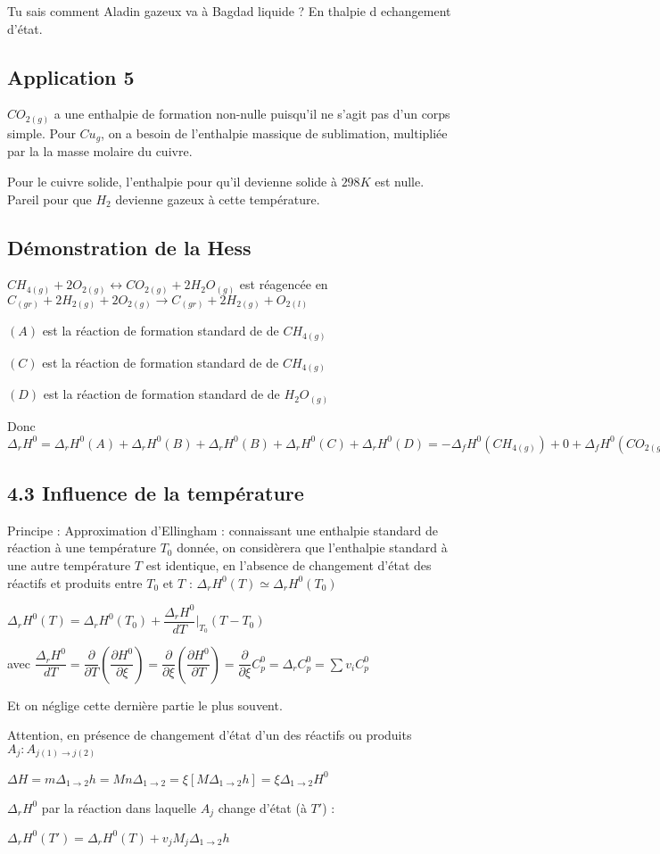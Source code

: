 \documentclass[a4paper,12pt]{book}
\begin{document}
Tu sais comment Aladin gazeux va à Bagdad liquide ? En thalpie d echangement d'état.
\subsection{Application 5}
$CO_{2(g)}$ a une enthalpie de formation non-nulle puisqu'il ne s'agit pas d'un corps simple. Pour $Cu_{g}$, on a besoin de l'enthalpie massique de sublimation, multipliée par la la masse molaire du cuivre.
\par Pour le cuivre solide, l'enthalpie pour qu'il devienne solide à $298K$ est nulle. Pareil pour que $H_2$ devienne gazeux à cette température.

\subsection{Démonstration de la Hess}
$CH_{4(g)} + 2O_{2(g)}\leftrightarrow CO_{2(g)}+2H_2O_{(g)}$ est réagencée en $C_{(gr)}+2H_{2(g)}+2O_{2(g)}\rightarrow C_{(gr)}+2H_{2(g)} +O_{2(l)}$
\par $(A)$ est la réaction de formation standard de de $CH_{4(g)}$ \par $(C)$ est la réaction de formation standard de de $CH_{4(g)}$ \par $(D)$ est la réaction de formation standard de de $H_2O_{(g)}$
\par Donc $\Delta_rH^0=\Delta_rH^0(A)+\Delta_rH^0(B)+\Delta_rH^0(B)+\Delta_rH^0(C)+\Delta_rH^0(D)=-\Delta_fH^0(CH_{4(g)})+0+\Delta_fH^0(CO_{2(g)})+2\Delta_fH^0(H_2O_{(g)})$




\subsection{4.3 Influence de la température}
Principe : Approximation d'Ellingham : connaissant une enthalpie standard de réaction à une température $T_0$ donnée, on considèrera que l'enthalpie standard à une autre température $T$ est identique, en l'absence de changement d'état des réactifs et produits entre $T_0$ et $T$ : $\Delta_r H^0(T)\simeq\Delta_rH^0(T_0)$
\par $\Delta_rH^0(T)=\Delta_rH^0(T_0)+\dfrac{\Delta_rH^0}{dT}\vert_{T_0}(T-T_0)$ \par avec $\dfrac{\Delta_rH^0}{dT}=\dfrac{\partial}{\partial T}\left(\dfrac{\partial H^0}{\partial\xi}\right)=\dfrac{\partial}{\partial\xi}\left(\dfrac{\partial H^0}{\partial T}\right) = \dfrac{\partial}{\partial\xi}C_p^0 = \Delta_rC_p^0 =\sum v_iC_p^0$ \par Et on néglige cette dernière partie le plus souvent. \par Attention, en présence de changement d'état d'un des réactifs ou produits $A_j : A_{j(1)\to j(2)}$
\par $\Delta H = m\Delta_{1\to 2}h = Mn\Delta_{1\to 2}=\xi\left[M\Delta_{1\to 2}h\right] = \xi\Delta_{1\to 2}H^0$ \par $\Delta_rH^0$ par la réaction dans laquelle $A_j$ change d'état (à $T'$) : \par $\Delta_rH^0(T')=\Delta_rH^0(T)+v_jM_j\Delta_{1\to 2}h$
\end{document}
